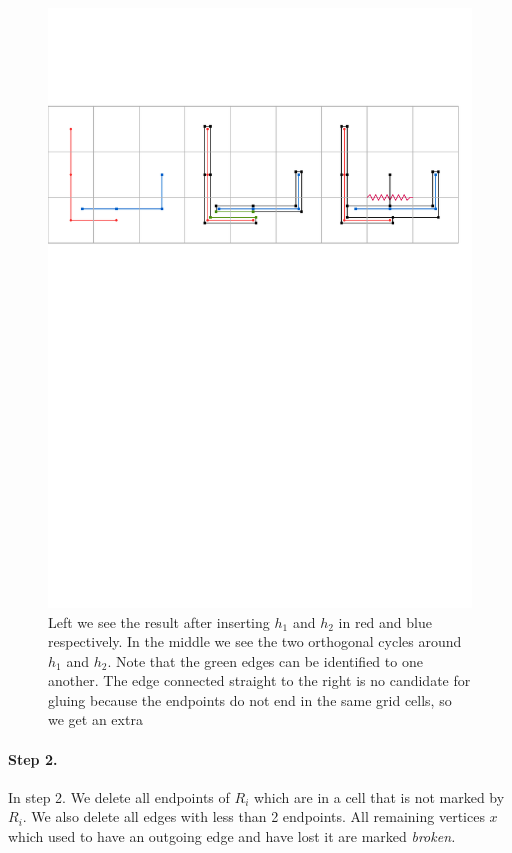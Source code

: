 \documentclass[a4paper, UKenglish]{lipics-v2018}
\begin{document}
\begin{figure}[H]
\centering
\includegraphics[page = 1]{Figures/cycle.pdf}
\caption{Left we see the result after inserting $h_1$ and $h_2$ in red and blue respectively. In the middle we see the two orthogonal cycles around $h_1$ and $h_2$. Note that the green edges can be identified to one another. The edge connected straight to the right is no candidate for gluing because the endpoints do not end in the same grid cells, so we get an extra }
\label{fig:cycle}
\end{figure}

\paragraph*{Step 2.}

In step 2. We delete all endpoints of $R_i$ which are in a cell that is not marked by $R_i$. We also delete all edges with less than 2 endpoints. All remaining vertices $x$ which used to have an outgoing edge and have lost it are marked \emph{broken.}
\end{document}

